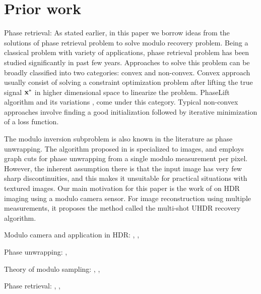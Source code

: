\section{Prior work}
\label{sec:prior}

Phase retrieval: As stated earlier, in this paper we borrow ideas from the solutions of phase retrieval problem to solve modulo recovery problem. Being a classical problem with variety of applications, phase retrieval problem has been studied significantly in past few years. Approaches to solve this problem can be broadly classified into two categories: convex and non-convex. 
Convex approach usually consist of solving a constraint optimization problem after lifting the true signal $\mathbf{x^*}$ in higher dimensional space to linearize the problem. PhaseLift algorithm \cite{candes2013phaselift} and its variations \cite{gross2017improved}, \cite{candes2015phase} come under this category. Typical non-convex approaches involve finding a good initialization followed by iterative minimization of a loss function.


The modulo inversion subproblem is also known in the literature
as phase unwrapping. The algorithm proposed in \cite{bioucas2007phase} is specialized to images, and employs graph cuts for phase unwrapping from a single modulo measurement per pixel. However, the inherent assumption there is that the input image has very few sharp discontinuities, and this makes it unsuitable for practical situations with textured images. Our main motivation for this paper is the work of \cite{ICCP15_Zhao} on HDR imaging using a modulo camera sensor. For image reconstruction using multiple measurements, it proposes the method called the multi-shot UHDR recovery algorithm.


Modulo camera and application in HDR: \cite{ICCP15_Zhao}, \cite{Shah}, \cite{Lang2017}

Phase unwrapping: \cite{bioucas2007phase}, \cite{Hooper2007}

Theory of modulo sampling: \cite{Bhandari}, \cite{Cucuringu2017}, \cite{Cucuringu2018}

Phase retrieval: \cite{Netrapalli2013}, \cite{Jagatap2017}, 


